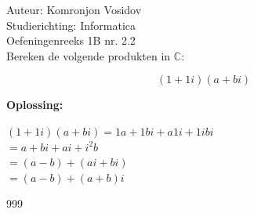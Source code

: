 \documentclass[a4paper]{article}
\begin{document}
	
	\noindent \large Auteur: Komronjon Vosidov \\
	\noindent \large Studierichting: Informatica\\
	\noindent \large Oefeningenreeks 1B nr. 2.2\\
	
	
	
	\normalsize
	Bereken de volgende produkten in $\mathbb{C}$:
	
	\begin{equation*}
		 (1+1i)(a+bi)
	\end{equation*}
	
	
	\noindent \textbf{Oplossing:}
	
	$(1+1i)(a+bi) = 1a + 1bi + a1i  + 1ibi $ \\	
	
	$= a + bi + ai + i^2 b $ \\
	
	$= (a-b)+(ai+bi)$ \\
	
	$= (a-b)+(a+b)i$ \\
	
\begin{thebibliography}{999}
	
\end{thebibliography}
	
	
\end{document}
